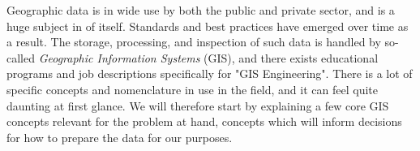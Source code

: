 Geographic data is in wide use by both the public and private sector, and is a huge subject in of itself.
Standards and best practices have emerged over time as a result.
The storage, processing, and inspection of such data is handled by so-called \textit{Geographic Information Systems} (GIS), and there exists educational programs and job descriptions specifically for "GIS Engineering".
There is a lot of specific concepts and nomenclature in use in the field, and it can feel quite daunting at first glance.
We will therefore start by explaining a few core GIS concepts relevant for the problem at hand, concepts which will inform decisions for how to prepare the data for our purposes.

